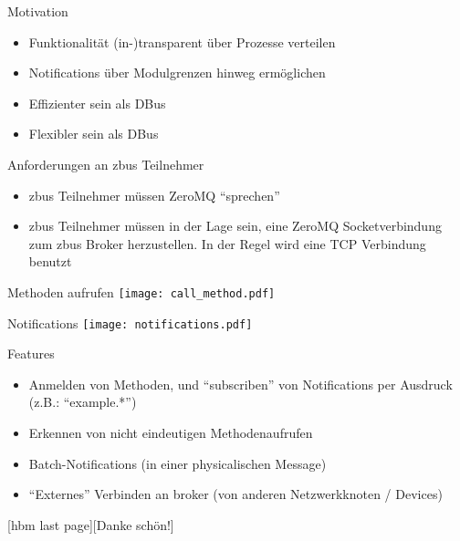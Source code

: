 \documentclass[xelatex,hyperref={pdfpagelabels=false}]{beamer}
\begin{document}
\begin{frame}[fragile]{Motivation}
\begin{itemize}
  \item Funktionalität (in-)transparent über Prozesse verteilen
  \item Notifications über Modulgrenzen hinweg ermöglichen
  \item Effizienter sein als DBus
  \item Flexibler sein als DBus
\end{itemize}
\end{frame}

\begin{frame}[fragile]{Anforderungen an zbus Teilnehmer}
\begin{itemize}
\item zbus Teilnehmer müssen ZeroMQ ``sprechen''
\item zbus Teilnehmer müssen in der Lage sein, eine
  ZeroMQ Socketverbindung zum zbus Broker herzustellen. In der Regel
  wird eine TCP Verbindung benutzt
\end{itemize}
\end{frame}

\begin{frame}[fragile]{Methoden aufrufen}
\texttt{[image: call\_method.pdf]}
\end{frame}

\begin{frame}[fragile]{Notifications}
\texttt{[image: notifications.pdf]}
\end{frame}

\begin{frame}[fragile]{Features}
  \begin{itemize}
    \item Anmelden von Methoden, und ``subscriben'' von Notifications
      per Ausdruck (z.B.: ``example.*'')
    \item Erkennen von nicht eindeutigen Methodenaufrufen
    \item Batch-Notifications (in einer physicalischen Message)
    \item ``Externes'' Verbinden an broker (von anderen Netzwerkknoten
      / Devices)
  \end{itemize}
\end{frame}


[hbm last page][Danke schön!]
\begin{frame}
  \titlepage
\end{frame}
\end{document}
